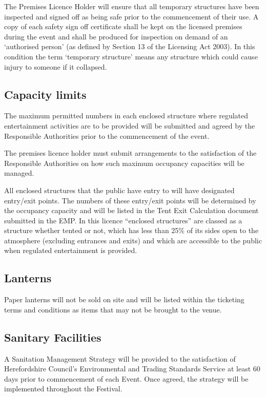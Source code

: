 The Premises Licence Holder will ensure that all temporary structures
have been inspected and signed off as being safe prior to the
commencement of their use. A copy of each safety sign off certificate
shall be kept on the licensed premises during the event and shall be
produced for inspection on demand of an `authorised person' (as defined
by Section 13 of the Licensing Act 2003). In this condition the term
`temporary structure' means any structure which could cause injury to
someone if it collapsed.

\subsection{Capacity limits}

The maximum permitted numbers in each enclosed structure where regulated
entertainment activities are to be provided will be submitted and agreed
by the Responsible Authorities prior to the commencement of the event.

The premises licence holder must submit arrangements to the satisfaction
of the Responsible Authorities on how such maximum occupancy capacities
will be managed.

All enclosed structures that the public have entry to will have
designated entry/exit points. The numbers of these entry/exit points
will be determined by the occupancy capacity and will be listed in the
Tent Exit Calculation document submitted in the EMP\@. In this licence
``enclosed structures'' are classed as a structure whether tented or
not, which has less than 25\% of its sides open to the atmosphere
(excluding entrances and exits) and which are accessible to the public
when regulated entertainment is provided.

\subsection{Lanterns}\label{lanterns}

Paper lanterns will not be sold on site and will be listed within the
ticketing terms and conditions as items that may not be brought to the
venue.

\subsection{Sanitary Facilities}\label{sanitary-facilities}

A Sanitation Management Strategy will be provided to the satisfaction of
Herefordshire Council's Environmental and Trading Standards Service at
least 60 days prior to commencement of each Event. Once agreed, the
strategy will be implemented throughout the Festival.

